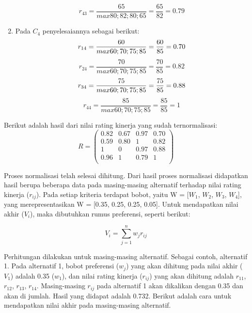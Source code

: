 \begin{enumerate}
\begin{displaymath}
r_{43} = \frac{65}{max {80;82;80;65}} = \frac{65}{82} = 0.79
\end{displaymath}
\item Pada $C_{4}$ penyelesaiannya sebagai berikut:
\begin{displaymath}
r_{14} = \frac{60}{max {60;70;75;85}} = \frac{60}{85} = 0.70\\
\end{displaymath}
\begin{displaymath}
r_{24} = \frac{70}{max {60;70;75;85}} = \frac{70}{85} = 0.82
\end{displaymath}
\begin{displaymath}
r_{34} = \frac{75}{max {60;70;75;85}} = \frac{75}{85} = 0.88\\
\end{displaymath}
\begin{displaymath}
r_{44} = \frac{85}{max {60;70;75;85}} = \frac{85}{85} = 1
\end{displaymath}
\end{enumerate}

Berikut adalah hasil dari nilai rating kinerja yang sudah ternormalisasi:
\begin{displaymath} R = 
\left (
\begin{array}{rrrrrrr}
0.82 & 0.67 & 0.97 & 0.70\\		
0.59 & 0.80 & 1 & 0.82\\
1 & 0 & 0.97 & 0.88 \\
0.96 & 1 & 0.79 & 1 \\
\end{array}\right )	
\end{displaymath}



Proses normalisasi telah selesai dihitung. Dari hasil proses normalisasi didapatkan hasil berupa beberapa data pada masing-masing alternatif terhadap nilai rating kinerja ($r_{ij}$). Pada setiap kriteria terdapat bobot, yaitu W = [$W_{1}$, $W_{2}$, $W_{3}$, $W_{4}$], yang merepresentasikan W = [0.35, 0.25, 0.25, 0.05]. Untuk mendapatkan nilai akhir ($V_{i}$), maka dibutuhkan rumus preferensi, seperti berikut:

\[
 V_{i} =\displaystyle\sum_{j=1}^{n} w_{j} r_{ij}
\]

Perhitungan dilakukan untuk masing-masing alternatif. Sebagai contoh, alternatif 1. Pada alternatif 1, bobot preferensi ($w_{j}$) yang akan dihitung pada nilai akhir ($V_{1}$) adalah 0.35 ($w_{1}$), dan nilai rating kinerja ($r_{ij}$) yang akan dihitung adalah $r_{11}$, $r_{12}$, $r_{13}$, $r_{14}$. Masing-masing $r_{ij}$ pada alternatif 1 akan dikalikan dengan 0.35 dan akan di jumlah. Hasil yang didapat adalah 0.732. Berikut adalah cara untuk mendapatkan nilai akhir pada masing-masing alternatif.

